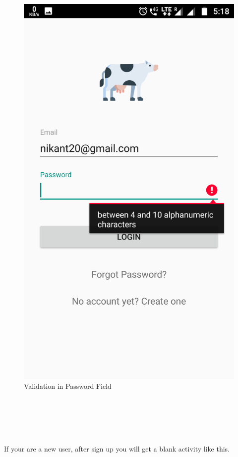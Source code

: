 \begin{figure}[h]
	\centering
	\includegraphics[width=0.7\linewidth]{s05}
	\caption{Validation in Password Field}
\end{figure}
\begin{text}
	\\
	\\
	\\
	\\
\end{text}
If your are a new user, after sign up you will get a blank activity like this.
